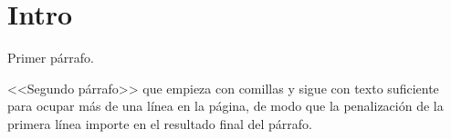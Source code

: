 \documentclass{article}
\begin{document}
\section{Intro}
Primer párrafo.

<<Segundo párrafo>> que empieza con comillas y sigue con texto suficiente para ocupar más de una línea en
la página, de modo que la penalización de la primera línea importe en el resultado final del párrafo.
\end{document}
